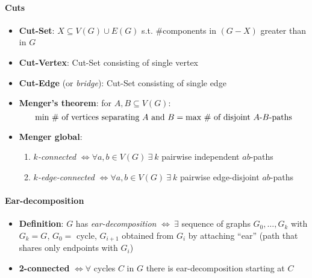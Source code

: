 \paragraph{Cuts}
\begin{itemize}
  \item \textbf{Cut-Set}: $ X \subseteq V(G) \cup E(G) $ s.t. \#components in $ (G-X) $ greater than in $ G $ 
  \item \textbf{Cut-Vertex}: Cut-Set consisting of single vertex
  \item \textbf{Cut-Edge} (or \emph{bridge}): Cut-Set consisting of single edge
  \item \textbf{Menger's theorem}: for $ A,B \subseteq V(G) $:
    \begin{equation*}
      \text{min \# of vertices separating $ A $ and $ B $} = \text{max \# of disjoint $ A $-$ B $-paths}
    \end{equation*}
  \item \textbf{Menger global}:
    \begin{enumerate}
      \item \emph{$ k $-connected} $ \Leftrightarrow \forall a,b \in V(G) \ \exists \ k $ pairwise independent $ ab $-paths
      \item \emph{$ k $-edge-connected} $ \Leftrightarrow \forall a,b \in V(G) \ \exists \ k $ pairwise edge-disjoint $ ab $-paths 
    \end{enumerate}
\end{itemize}

\paragraph{Ear-decomposition}
\begin{itemize}
  \item \textbf{Definition}: $ G $ has \emph{ear-decomposition} $ \Leftrightarrow \ \exists $ sequence of graphs $ G_0, \dots, G_k $ with $ G_k = G $, $ G_0 = $ cycle, $ G_{i+1} $ obtained from $ G_i $ by attaching ``ear'' (path that shares only endpoints with $ G_i $)
  \item \textbf{2-connected} $ \Leftrightarrow \forall $ cycles $ C $ in $ G $ there is ear-decomposition starting at $ C $
\end{itemize}

